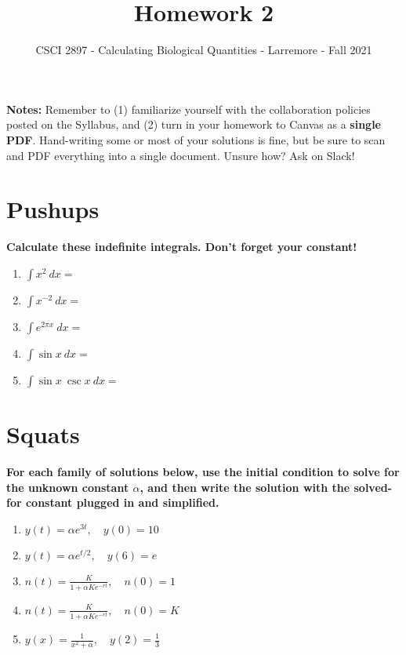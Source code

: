 \documentclass[11pt,onecolumn,superscriptaddress,notitlepage]{article}
\date{}
\begin{document}
\author{CSCI 2897 - Calculating Biological Quantities - Larremore - Fall 2021}
\title{Homework 2}
\maketitle

{\bf Notes:} Remember to (1) familiarize yourself with the collaboration policies posted on the Syllabus, and (2) turn in your homework to Canvas as a {\bf single PDF}. Hand-writing some or most of your solutions is fine, but be sure to scan and PDF everything into a single document. Unsure how? Ask on Slack! 

\section*{Pushups}

{\bf Calculate these indefinite integrals. Don't forget your constant!} 

\begin{enumerate}
	\item $\displaystyle\int x^2\ dx=$
	\item $\displaystyle\int x^{-2}\ dx = $
	\item $\displaystyle\int e^{2 \pi x}\ dx = $
	\item $\displaystyle\int \sin{x}\ dx = $
	\item $\displaystyle\int \sin{x}\ \csc{x}\ dx = $
\end{enumerate}

\section*{Squats} 

{\bf For each family of solutions below, use the initial condition to solve for the unknown constant $\alpha$, and then write the solution with the solved-for constant plugged in and simplified.}

\begin{enumerate}[resume]
	\item $y(t) = \alpha e^{3t}, \quad y(0) = 10 $
	\item $y(t) = \alpha e^{t/2}, \quad y(6) = e $
	\item $\displaystyle n(t) = \frac{K}{1+\alpha Ke^{-r t}}, \quad n(0) = 1$
	\item $\displaystyle n(t) = \frac{K}{1+ \alpha Ke^{-r t}}, \quad n(0) = K$
	\item $\displaystyle y(x) = \frac{1}{x^2 + \alpha}, \quad y(2) = \frac{1}{3}$  
\end{enumerate}
\end{document}
